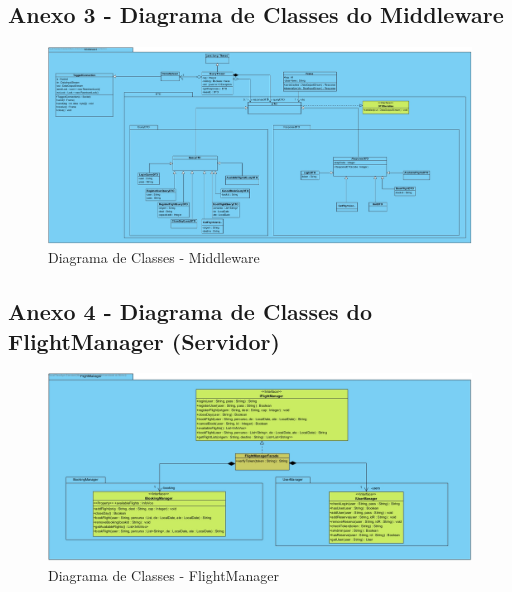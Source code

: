 \documentclass[a4paper,11pt]{article}
\begin{document}
\begin{landscape}
    \subsection{Anexo 3 - Diagrama de Classes do Middleware}
    \begin{figure}[!ht]
        \centering
        \includegraphics[width=\linewidth]{diagramas/MiddlewareClassDiagram.jpg}
        \caption{Diagrama de Classes - Middleware} \label{img:middleware}
    \end{figure}
\end{landscape}

\begin{landscape}
    \subsection{Anexo 4 - Diagrama de Classes do FlightManager (Servidor)}
    \begin{figure}[!ht]
        \centering
        \includegraphics[width=\linewidth]{diagramas/FlightManager.jpg}
        \caption{Diagrama de Classes - FlightManager} \label{img:flight_manager}
    \end{figure}
\end{landscape}
\end{document}
